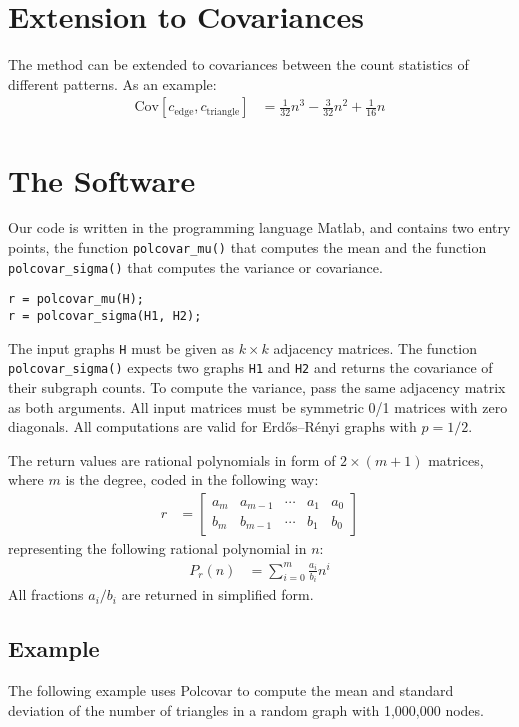 \documentclass{article}
\begin{document}
\section{Extension to Covariances}
The method can be extended to covariances between the count statistics
of different patterns.  As an example:
\begin{align*}
  \mathrm{Cov}[c_{\mathrm{edge}}, c_{\mathrm{triangle}}] &=
  \frac{1}{32}n^3 -\frac{3}{32}n^2 +\frac{1}{16}n
\end{align*}

\section{The Software}
Our code is written in the programming language Matlab, and contains two
entry points, the function \texttt{polcovar\_mu()} that computes the
mean and the function \texttt{polcovar\_sigma()} that computes the
variance or covariance. 

\begin{verbatim}
r = polcovar_mu(H);
r = polcovar_sigma(H1, H2);
\end{verbatim}

The input graphs \texttt{H} must be given as $k \times k$ adjacency matrices.
The function \texttt{polcovar\_sigma()} expects two graphs \texttt{H1} and
\texttt{H2} and returns the covariance of their subgraph counts.  To compute
the variance, pass the same adjacency matrix as both arguments.  All
input matrices must be symmetric 0/1 matrices with zero diagonals. 
All computations are valid for Erdős--Rényi graphs with $p=1/2$. 

The return values are rational polynomials in form of $2 \times (m+1)$
matrices, where $m$ is the degree, coded in the following way:
\begin{align*}
  r &= \left[ \begin{array} {ccccc}
      a_m & a_{m-1} & \cdots & a_1 & a_0 \\
      b_m & b_{m-1} & \cdots & b_1 & b_0 
      \end{array} \right]
\end{align*}
representing the following rational polynomial in $n$:
\begin{align*}
  P_r(n) &= \sum_{i=0}^m  \frac {a_i} {b_i} n ^ i
\end{align*}
All fractions $a_i / b_i$ are returned in simplified form. 

\subsection{Example}
The following example uses Polcovar to compute the mean and standard
deviation of the number of triangles in a random graph with 1,000,000
nodes.
\end{document}
